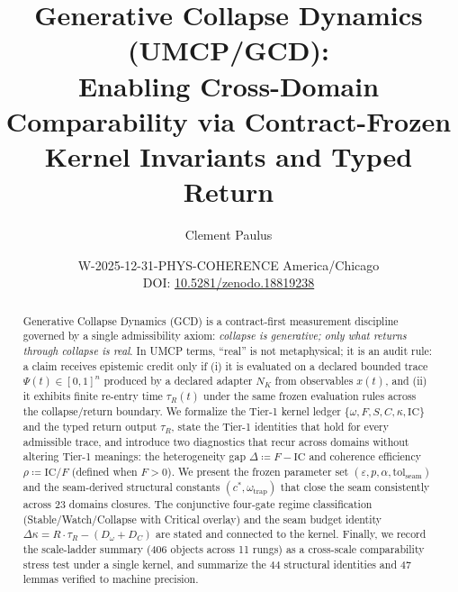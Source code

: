 \documentclass[
  aps,
  prd,
  preprint,
  superscriptaddress,
  nofootinbib,
  floatfix
]{revtex4-2}
\newcommand{\IC}{\mathrm{IC}}
\newcommand{\PaperDOI}{10.5281/zenodo.18819238}
\newcommand{\Timezone}{America/Chicago}
\newcommand{\WeldID}{W-2025-12-31-PHYS-COHERENCE}
\begin{document}
\title{Generative Collapse Dynamics (UMCP/GCD):
\texorpdfstring{\\}{: }Enabling Cross-Domain Comparability via Contract-Frozen
Kernel Invariants and Typed Return}

\author{Clement Paulus}

\date{\WeldID\enspace\textperiodcentered\enspace
\Timezone\\
DOI: \href{https://doi.org/\PaperDOI}{\PaperDOI}}


\begin{abstract}
Generative Collapse Dynamics (GCD) is a contract-first measurement discipline governed by a single admissibility axiom:
\emph{collapse is generative; only what returns through collapse is real}.
In UMCP terms, ``real'' is not metaphysical; it is an audit rule: a claim receives epistemic credit only if
(i) it is evaluated on a declared bounded trace $\Psi(t)\in[0,1]^n$ produced by a declared adapter $N_K$ from observables $x(t)$,
and (ii) it exhibits finite re-entry time $\tau_R(t)$ under the same frozen evaluation rules across the collapse/return boundary.
We formalize the Tier-1 kernel ledger $\{\omega,F,S,C,\kappa,\IC\}$ and the typed return output $\tau_R$,
state the Tier-1 identities that hold for every admissible trace, and introduce two diagnostics that recur across domains
without altering Tier-1 meanings: the heterogeneity gap $\Delta \coloneqq F-\IC$ and coherence efficiency
$\rho \coloneqq \IC/F$ (defined when $F>0$).
We present the frozen parameter set $(\varepsilon, p, \alpha, \mathrm{tol}_{\mathrm{seam}})$ and the seam-derived structural
constants $(c^*, \omega_{\mathrm{trap}})$ that close the seam consistently across 23 domains closures.
The conjunctive four-gate regime classification (Stable/Watch/Collapse with Critical overlay) and the
seam budget identity $\Delta\kappa = R\cdot\tau_R - (D_\omega + D_C)$ are stated and connected to the kernel.
Finally, we record the scale-ladder summary (406 objects across 11 rungs) as a cross-scale comparability stress test
under a single kernel, and summarize the 44 structural identities and 47 lemmas verified to machine precision.
\end{abstract}
\end{document}
